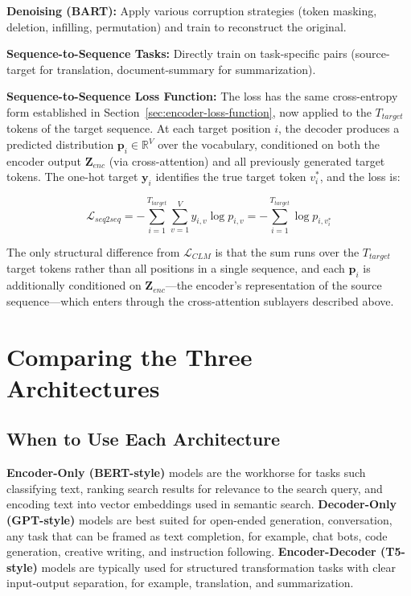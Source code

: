 \documentclass{book}
\begin{document}
\textbf{Denoising (BART):} Apply various corruption strategies (token masking, deletion, infilling, permutation) and train to reconstruct the original.

\textbf{Sequence-to-Sequence Tasks:} Directly train on task-specific pairs (source-target for translation, document-summary for summarization).

\textbf{Sequence-to-Sequence Loss Function:}
The loss has the same cross-entropy form established in
Section~\ref{sec:encoder-loss-function}, now applied to the $T_{target}$ tokens
of the target sequence. At each target position $i$, the decoder produces a
predicted distribution $\mathbf{p}_i \in \mathbb{R}^V$ over the vocabulary,
conditioned on both the encoder output $\mathbf{Z}_{enc}$ (via cross-attention)
and all previously generated target tokens. The one-hot target $\mathbf{y}_i$
identifies the true target token $v^*_i$, and the loss is:

\begin{equation}
\mathcal{L}_{seq2seq}
    = -\sum_{i=1}^{T_{target}} \sum_{v=1}^{V} y_{i,v} \log p_{i,v}
    = -\sum_{i=1}^{T_{target}} \log p_{i,v^*_i}
\end{equation}

The only structural difference from $\mathcal{L}_{CLM}$ is that the sum runs
over the $T_{target}$ target tokens rather than all positions in a single
sequence, and each $\mathbf{p}_i$ is additionally conditioned on
$\mathbf{Z}_{enc}$---the encoder's representation of the source sequence---which
enters through the cross-attention sublayers described above.

\section{Comparing the Three Architectures}

\subsection{When to Use Each Architecture}

\textbf{Encoder-Only (BERT-style)} models are the workhorse for tasks such classifying text, ranking search results for relevance to the search query, and encoding text into vector embeddings used in semantic search. \textbf{Decoder-Only (GPT-style)} models are best suited for 
open-ended generation, conversation, any task that can be framed as text completion, for example, chat bots, code generation, creative writing, and instruction following. \textbf{Encoder-Decoder (T5-style)} models are typically used for structured transformation tasks with clear input-output separation, for example, translation, and summarization.
\end{document}
